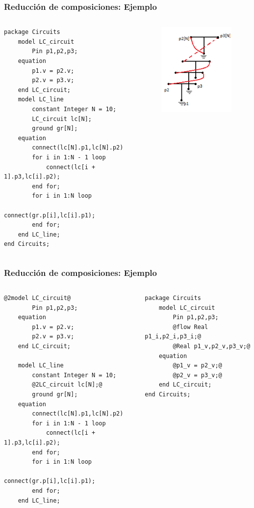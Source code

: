 \begin{frame}[fragile]
\frametitle{Reducción de composiciones: Ejemplo}
\begin{columns} 
\column[t]{7cm}  
\begin{lstlisting}[style=base,basicstyle=\scriptsize]
package Circuits
    model LC_circuit
        Pin p1,p2,p3;
    equation
        p1.v = p2.v;
        p2.v = p3.v;
    end LC_circuit;
    model LC_line
        constant Integer N = 10;
        LC_circuit lc[N];
        ground gr[N];
    equation
        connect(lc[N].p1,lc[N].p2)      
        for i in 1:N - 1 loop
            connect(lc[i + 1].p3,lc[i].p2);
        end for;
        for i in 1:N loop
            connect(gr.p[i],lc[i].p1);
        end for;
    end LC_line;
end Circuits;
\end{lstlisting}

\column[t]{7cm}  
\begin{figure}
      \centering
      \includegraphics[scale=0.8]{lcline} 
    \end{figure}
\end{columns}
\end{frame}

\begin{frame}[fragile]
\frametitle{Reducción de composiciones: Ejemplo}
\begin{columns} 
\column[t]{7cm}  
\begin{lstlisting}[style=base,basicstyle=\scriptsize]
    @2model LC_circuit@
        Pin p1,p2,p3;
    equation
        p1.v = p2.v;
        p2.v = p3.v;
    end LC_circuit;
    
    model LC_line
        constant Integer N = 10;
        @2LC_circuit lc[N];@
        ground gr[N];
    equation
        connect(lc[N].p1,lc[N].p2)      
        for i in 1:N - 1 loop
            connect(lc[i + 1].p3,lc[i].p2);
        end for;
        for i in 1:N loop
            connect(gr.p[i],lc[i].p1);
        end for;
    end LC_line;
\end{lstlisting}
\pause
\column[t]{7cm}  
\begin{lstlisting}[style=base]
package Circuits
    model LC_circuit
        Pin p1,p2,p3;
        @flow Real p1_i,p2_i,p3_i;@
        @Real p1_v,p2_v,p3_v;@
    equation
        @p1_v = p2_v;@
        @p2_v = p3_v;@
    end LC_circuit;
end Circuits;
\end{lstlisting}
\end{columns}
\end{frame}

